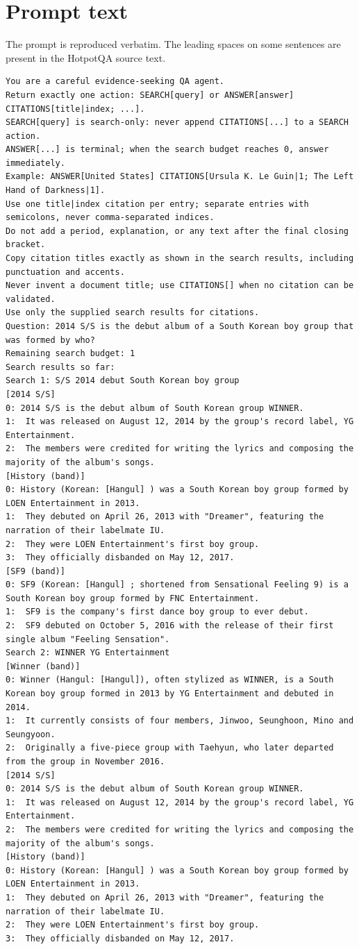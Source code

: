 \section{Prompt text}\label{prompt-text}

The prompt is reproduced verbatim. The leading spaces on some sentences
are present in the HotpotQA source text.

\begin{Verbatim}
You are a careful evidence-seeking QA agent.
Return exactly one action: SEARCH[query] or ANSWER[answer] CITATIONS[title|index; ...].
SEARCH[query] is search-only: never append CITATIONS[...] to a SEARCH action.
ANSWER[...] is terminal; when the search budget reaches 0, answer immediately.
Example: ANSWER[United States] CITATIONS[Ursula K. Le Guin|1; The Left Hand of Darkness|1].
Use one title|index citation per entry; separate entries with semicolons, never comma-separated indices.
Do not add a period, explanation, or any text after the final closing bracket.
Copy citation titles exactly as shown in the search results, including punctuation and accents.
Never invent a document title; use CITATIONS[] when no citation can be validated.
Use only the supplied search results for citations.
Question: 2014 S/S is the debut album of a South Korean boy group that was formed by who?
Remaining search budget: 1
Search results so far:
Search 1: S/S 2014 debut South Korean boy group
[2014 S/S]
0: 2014 S/S is the debut album of South Korean group WINNER.
1:  It was released on August 12, 2014 by the group's record label, YG Entertainment.
2:  The members were credited for writing the lyrics and composing the majority of the album's songs.
[History (band)]
0: History (Korean: [Hangul] ) was a South Korean boy group formed by LOEN Entertainment in 2013.
1:  They debuted on April 26, 2013 with "Dreamer", featuring the narration of their labelmate IU.
2:  They were LOEN Entertainment's first boy group.
3:  They officially disbanded on May 12, 2017.
[SF9 (band)]
0: SF9 (Korean: [Hangul] ; shortened from Sensational Feeling 9) is a South Korean boy group formed by FNC Entertainment.
1:  SF9 is the company's first dance boy group to ever debut.
2:  SF9 debuted on October 5, 2016 with the release of their first single album "Feeling Sensation".
Search 2: WINNER YG Entertainment
[Winner (band)]
0: Winner (Hangul: [Hangul]), often stylized as WINNER, is a South Korean boy group formed in 2013 by YG Entertainment and debuted in 2014.
1:  It currently consists of four members, Jinwoo, Seunghoon, Mino and Seungyoon.
2:  Originally a five-piece group with Taehyun, who later departed from the group in November 2016.
[2014 S/S]
0: 2014 S/S is the debut album of South Korean group WINNER.
1:  It was released on August 12, 2014 by the group's record label, YG Entertainment.
2:  The members were credited for writing the lyrics and composing the majority of the album's songs.
[History (band)]
0: History (Korean: [Hangul] ) was a South Korean boy group formed by LOEN Entertainment in 2013.
1:  They debuted on April 26, 2013 with "Dreamer", featuring the narration of their labelmate IU.
2:  They were LOEN Entertainment's first boy group.
3:  They officially disbanded on May 12, 2017.
\end{Verbatim}

